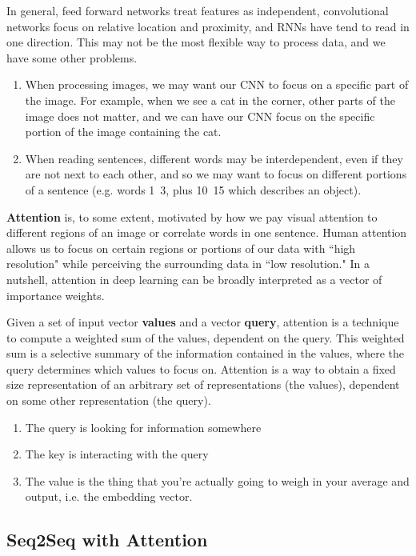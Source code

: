 \documentclass{article}
\theoremstyle{definition}
\theoremstyle{remark}
\theoremstyle{definition}
\begin{document}
In general, feed forward networks treat features as independent, convolutional networks focus on relative location and proximity, and RNNs have tend to read in one direction. This may not be the most flexible way to process data, and we have some other problems. 
\begin{enumerate}
    \item When processing images, we may want our CNN to focus on a specific part of the image. For example, when we see a cat in the corner, other parts of the image does not matter, and we can have our CNN focus on the specific portion of the image containing the cat. 
    \item When reading sentences, different words may be interdependent, even if they are not next to each other, and so we may want to focus on different portions of a sentence (e.g. words 1~3, plus 10~15 which describes an object). 
\end{enumerate}
\textbf{Attention} is, to some extent, motivated by how we pay visual attention to different regions of an image or correlate words in one sentence. Human attention allows us to focus on certain regions or portions of our data with ``high resolution" while perceiving the surrounding data in ``low resolution." In a nutshell, attention in deep learning can be broadly interpreted as a vector of importance weights. 

Given a set of input vector \textbf{values} and a vector \textbf{query}, attention is a technique to compute a weighted sum of the values, dependent on the query. This weighted sum is a selective summary of the information contained in the values, where the query determines which values to focus on. Attention is a way to obtain a fixed size representation of an arbitrary set of representations (the values), dependent on some other representation (the query). 


\begin{enumerate}
    \item The query is looking for information somewhere
    \item The key is interacting with the query 
    \item The value is the thing that you're actually going to weigh in your average and output, i.e. the embedding vector. 
\end{enumerate}


\subsection{Seq2Seq with Attention}
\end{document}
